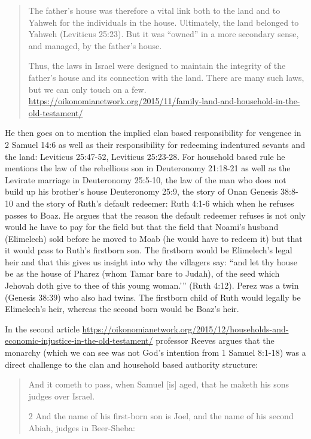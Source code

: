 \documentclass[11pt]{article}
\begin{document}
{\begin{quote}
The father’s house was therefore a vital link both to the land and to Yahweh for the individuals in the house. Ultimately, the land belonged to Yahweh (Leviticus 25:23). But it was “owned” in a more secondary sense, and managed, by the father’s house.

Thus, the laws in Israel were designed to maintain the integrity of the father’s house and its connection with the land. There are many such laws, but we can only touch on a few. \url{https://oikonomianetwork.org/2015/11/family-land-and-household-in-the-old-testament/}
\end{quote}

He then goes on to mention the implied clan based responsibility for vengence in 2 Samuel 14:6 as well as their responsibility for redeeming indentured sevants and the land: Leviticus 25:47-52, Leviticus 25:23-28. For household based rule he mentions the law of the rebellious son in Deuteronomy 21:18-21 as well as the Levirate marriage in Deuteronomy 25:5-10, the law of the man who does not build up his brother's house Deuteronomy 25:9, the story of Onan Genesis 38:8-10 and the story of Ruth's default redeemer: Ruth 4:1-6 which when he refuses passes to Boaz. He argues that the reason the default redeemer refuses is not only would he have to pay for the field but that the field that Noami's husband (Elimelech) sold before he moved to Moab (he would have to redeem it) but that it would pass to Ruth's firstborn son. The firstborn would be Elimelech's legal heir and that this gives us insight into why the villagers say: “and let thy house be as the house of Pharez (whom Tamar bare to Judah), of the seed which Jehovah doth give to thee of this young woman.'” (Ruth 4:12). Perez was a twin (Genesis 38:39) who also had twins. The firstborn child of Ruth would legally be Elimelech’s heir, whereas the second born would be Boaz’s heir. 

In the second article \url{https://oikonomianetwork.org/2015/12/households-and-economic-injustice-in-the-old-testament/} professor Reeves argues that the monarchy (which we can see was not God's intention from 1 Samuel 8:1-18) was a direct challenge to the clan and household based authority structure:

\begin{quote}
And it cometh to pass, when Samuel [is] aged, that he maketh his sons judges over Israel.

2 And the name of his first-born son is Joel, and the name of his second Abiah, judges in Beer-Sheba:


\end{quote}}
\end{document}
